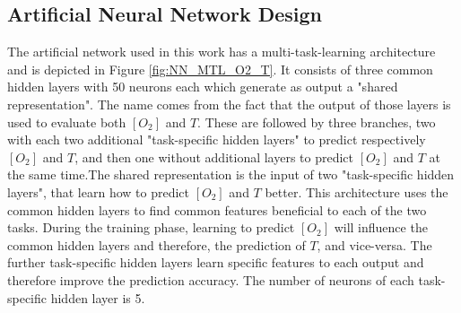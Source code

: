 \documentclass[9pt,twocolumn,twoside,pdftex]{optica}
\begin{document}
\subsection{Artificial Neural Network Design}
\label{NN}

The artificial network used in this work has a multi-task-learning architecture and is depicted in Figure \ref{fig:NN_MTL_O2_T}. It consists of three common hidden layers with 50 neurons each which generate as output a "shared representation". The name comes from the fact that the output of those layers is used to evaluate both $[O_2]$ and $T$. These are followed by three branches, two with each two additional "task-specific hidden layers" to predict respectively $[O_2]$ and $T$, and then one without additional layers to predict $[O_2]$ and $T$ at the same time.The shared representation is the input of two "task-specific hidden layers", that learn how to predict $[O_2]$ and $T$ better. This architecture uses the common hidden layers to find common features beneficial to each of the two tasks. During the training phase, learning to predict $[O_2]$ will influence the common hidden layers and therefore, the prediction of $T$, and vice-versa. The further task-specific hidden layers learn specific features to each output and therefore improve the prediction accuracy. The number of neurons of each task-specific hidden layer is 5.
\end{document}
